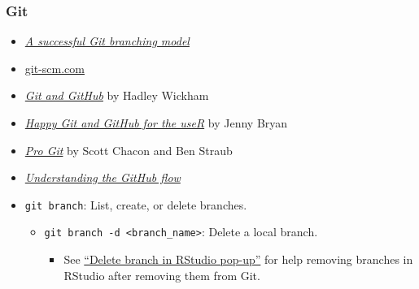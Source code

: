 \documentclass[
]{book}
\providecommand{\tightlist}{%
  \setlength{\itemsep}{0pt}\setlength{\parskip}{0pt}}
\begin{document}
\hypertarget{git}{%
\subsubsection{Git}\label{git}}

\begin{itemize}
\item
  \href{https://nvie.com/posts/a-successful-git-branching-model/}{\emph{A successful Git branching model}}
\item
  \href{https://git-scm.com/}{git-scm.com}
\item
  \href{http://r-pkgs.had.co.nz/git.html\#git-learning}{\emph{Git and GitHub}} by Hadley Wickham
\item
  \href{http://happygitwithr.com/}{\emph{Happy Git and GitHub for the useR}} by Jenny Bryan
\item
  \href{https://git-scm.com/book/en/v2}{\emph{Pro Git}} by Scott Chacon and Ben Straub
\item
  \href{https://guides.github.com/introduction/flow/}{\emph{Understanding the GitHub flow}}
\item
  \texttt{git\ branch}: List, create, or delete branches.

  \begin{itemize}
  \tightlist
  \item
    \texttt{git\ branch\ -d\ \textless{}branch\_name\textgreater{}}: Delete a local branch.

    \begin{itemize}
    \tightlist
    \item
      See \href{https://community.rstudio.com/t/delete-branch-in-rstudio-pop-up/15465}{``Delete branch in RStudio pop-up''} for help removing branches in RStudio after removing them from Git.
    \end{itemize}
  \end{itemize}
\end{itemize}

  
\end{document}
